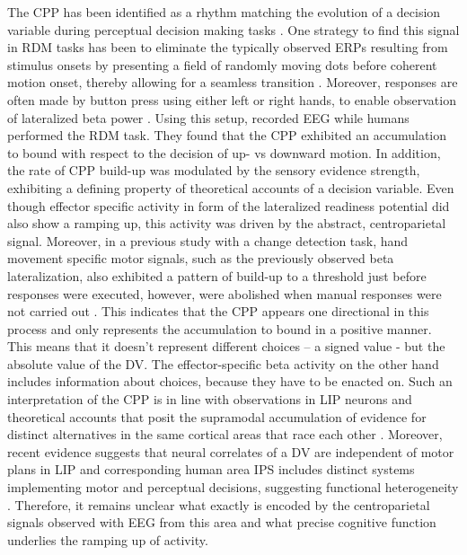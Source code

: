 The CPP has been identified as a rhythm matching the evolution of a decision variable during perceptual decision making tasks \parencite{Kelly2013,Kelly2015,Philiastides2014,Twomey2015}. One strategy to find this signal in RDM tasks has been to eliminate the typically observed ERPs resulting from stimulus onsets by presenting a field of randomly moving dots before coherent motion onset, thereby allowing for a seamless transition \parencite{Kelly2013}. Moreover, responses are often made by button press using either left or right hands, to enable observation of lateralized beta power \parencite[as in][]{DeLange2013,Donner2009}. Using this setup, \textcite{Kelly2013} recorded EEG while humans performed the RDM task. They found that the CPP exhibited an accumulation to bound with respect to the decision of up- vs downward motion. In addition, the rate of CPP build-up was modulated by the sensory evidence strength, exhibiting a defining property of theoretical accounts of a decision variable. Even though effector specific activity in form of the lateralized readiness potential \parencite{Eimer1998,Smulders2012} did also show a ramping up, this activity was driven by the abstract, centroparietal signal. Moreover, in a previous study with a change detection task, hand movement specific motor signals, such as the previously observed beta lateralization, also exhibited a pattern of build-up to a threshold just before responses were executed, however, were abolished when manual responses were not carried out \parencite{OConnell2012}. This indicates that the CPP appears one directional in this process and only represents the accumulation to bound in a positive manner. This means that it doesn’t represent different choices – a signed value - but the absolute value of the DV. The effector-specific beta activity on the other hand includes information about choices, because they have to be enacted on. Such an interpretation of the CPP  is in line with observations in LIP neurons and theoretical accounts that posit the supramodal accumulation of evidence for distinct alternatives in the same cortical areas that race each other \parencite{Brown2008,Roitman2002,Usher2001}. Moreover, recent evidence suggests that neural correlates of a DV are independent of motor plans in LIP \parencite{Bennur2011} and corresponding human area IPS includes distinct systems implementing motor and perceptual decisions, suggesting functional heterogeneity \parencite{Filimon2013}. Therefore, it remains unclear what exactly is encoded by the centroparietal signals observed with EEG from this area and what precise cognitive function underlies the ramping up of activity.

